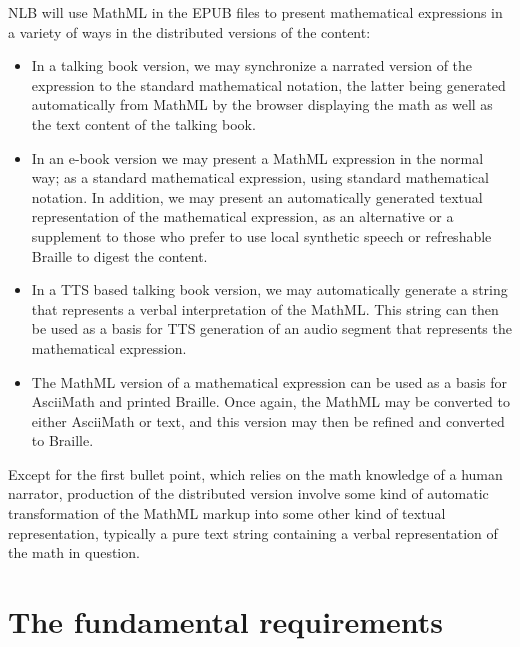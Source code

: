 \documentclass[english,a4paper,11pt]{article}
\begin{document}
NLB will use MathML in the EPUB files to present mathematical expressions in a variety of ways in the distributed versions of the content:
\begin{itemize}
	\item In a talking book version, we may synchronize a narrated version of the expression to the standard mathematical notation, the latter being generated automatically from MathML by the browser displaying the math as well as the text content of the talking book.

	\item In an e-book version we may present a MathML expression in the normal way; as a standard mathematical expression, using standard mathematical notation. In addition, we may present an automatically generated  textual representation of the mathematical expression, as an alternative or a supplement to those who prefer to use local synthetic speech or refreshable Braille to digest the content.
	
	\item In a TTS based talking book version, we may automatically generate a string that represents a verbal interpretation of the MathML. This string can then be used as a basis for TTS generation of an audio segment that represents the mathematical expression.

	\item The MathML version of a mathematical expression can be used as a basis for AsciiMath and printed Braille. Once again, the MathML may be converted to either AsciiMath or text, and this version may then be refined and converted to Braille.
\end{itemize}
Except for the first bullet point, which relies on the math knowledge of a  human narrator, production of the distributed version involve some kind of automatic transformation of the MathML markup into some other kind of textual representation, typically a pure text string containing a verbal representation of the math in question. 

\section{The fundamental requirements}
\end{document}
